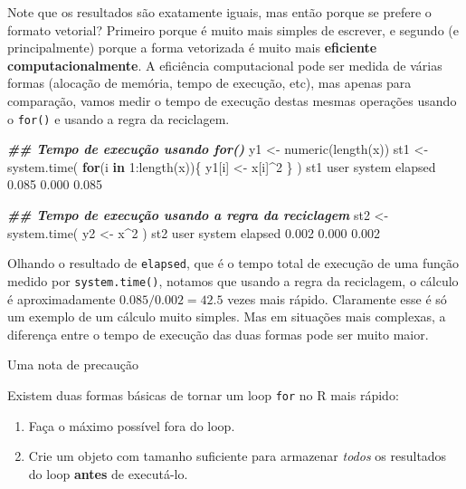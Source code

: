 \documentclass[
  10pt,
  a4paper]{book}
\newenvironment{Shaded}{\begin{snugshade}}{\end{snugshade}}
\newcommand{\ControlFlowTok}[1]{\textcolor[rgb]{0.13,0.29,0.53}{\textbf{#1}}}
\newcommand{\DecValTok}[1]{\textcolor[rgb]{0.00,0.00,0.81}{#1}}
\newcommand{\DocumentationTok}[1]{\textcolor[rgb]{0.56,0.35,0.01}{\textbf{\textit{#1}}}}
\newcommand{\FloatTok}[1]{\textcolor[rgb]{0.00,0.00,0.81}{#1}}
\newcommand{\FunctionTok}[1]{\textcolor[rgb]{0.00,0.00,0.00}{#1}}
\newcommand{\NormalTok}[1]{#1}
\newcommand{\OtherTok}[1]{\textcolor[rgb]{0.56,0.35,0.01}{#1}}
\newcommand{\SpecialCharTok}[1]{\textcolor[rgb]{0.00,0.00,0.00}{#1}}
\providecommand{\tightlist}{%
  \setlength{\itemsep}{0pt}\setlength{\parskip}{0pt}}
\begin{document}
Note que os resultados são exatamente iguais, mas então porque se
prefere o formato vetorial? Primeiro porque é muito mais simples de
escrever, e segundo (e principalmente) porque a forma vetorizada é
muito mais \textbf{eficiente computacionalmente}. A eficiência computacional
pode ser medida de várias formas (alocação de memória, tempo de
execução, etc), mas apenas para comparação, vamos medir o tempo de
execução destas mesmas operações usando o \texttt{for()} e usando a regra da
reciclagem.

\begin{Shaded}
\begin{Highlighting}[]
\DocumentationTok{\#\# Tempo de execução usando for()}
\NormalTok{y1 }\OtherTok{\textless{}{-}} \FunctionTok{numeric}\NormalTok{(}\FunctionTok{length}\NormalTok{(x))}
\NormalTok{st1 }\OtherTok{\textless{}{-}} \FunctionTok{system.time}\NormalTok{(}
    \ControlFlowTok{for}\NormalTok{(i }\ControlFlowTok{in} \DecValTok{1}\SpecialCharTok{:}\FunctionTok{length}\NormalTok{(x))\{}
\NormalTok{        y1[i] }\OtherTok{\textless{}{-}}\NormalTok{ x[i]}\SpecialCharTok{\^{}}\DecValTok{2}
\NormalTok{    \}}
\NormalTok{)}
\NormalTok{st1}
\NormalTok{   user  system elapsed }
  \FloatTok{0.085}   \FloatTok{0.000}   \FloatTok{0.085} 

\DocumentationTok{\#\# Tempo de execução usando a regra da reciclagem}
\NormalTok{st2 }\OtherTok{\textless{}{-}} \FunctionTok{system.time}\NormalTok{(}
\NormalTok{    y2 }\OtherTok{\textless{}{-}}\NormalTok{ x}\SpecialCharTok{\^{}}\DecValTok{2}
\NormalTok{)}
\NormalTok{st2}
\NormalTok{   user  system elapsed }
  \FloatTok{0.002}   \FloatTok{0.000}   \FloatTok{0.002} 
\end{Highlighting}
\end{Shaded}

Olhando o resultado de \texttt{elapsed}, que é o tempo total de execução de uma
função medido por \texttt{system.time()}, notamos que usando a regra da
reciclagem, o cálculo é aproximadamente
\(0.085/0.002 = 42.5\) vezes mais rápido.
Claramente esse é só um exemplo de um cálculo muito simples. Mas em
situações mais complexas, a diferença entre o tempo de execução das duas
formas pode ser muito maior.

Uma nota de precaução

Existem duas formas básicas de tornar um loop \texttt{for} no R mais rápido:

\begin{enumerate}
\def\labelenumi{\arabic{enumi}.}
\tightlist
\item
  Faça o máximo possível fora do loop.
\item
  Crie um objeto com tamanho suficiente para armazenar \emph{todos} os
  resultados do loop \textbf{antes} de executá-lo.
\end{enumerate}
\end{document}
